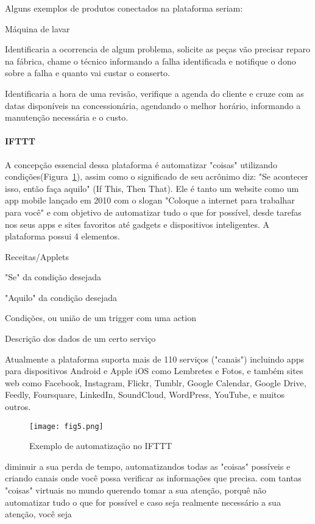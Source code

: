 	Alguns exemplos de produtos conectados na plataforma seriam: 
	\begin{labeling}{M\'aquina de lavar}
		\item[M\'aquina de lavar] Identificaria a ocorrencia de algum problema, solicite as pe\c{c}as v\~ao precisar reparo na f\'abrica, chame o t\'ecnico informando a falha identificada e notifique o dono sobre a falha e quanto vai custar o conserto. 
		\item[Carro] Identificaria a hora de uma revis\~ao, verifique a agenda do cliente e cruze com as datas dispon\'iveis na concession\'aria, agendando o melhor hor\'ario, informando a manuten\c{c}\~ao necess\'aria e o custo.
	\end{labeling}

\paragraph{IFTTT}
	A concep\c{c}\~ao essencial dessa plataforma \'e automatizar "coisas" utilizando condi\c{c}\~oes(Figura~\ref{fig:ifttt}), assim como o significado de seu acr\^onimo diz: "Se acontecer isso, ent\~ao fa\c{c}a aquilo" (If This, Then That). Ele \'e tanto um website como um app mobile lan\c{c}ado em 2010 com o slogan "Coloque a internet para trabalhar para voc\^e" e com objetivo de automatizar tudo o que for poss\'ivel, desde tarefas nos seus apps e sites favoritos at\'e gadgets e dispositivos inteligentes. A plataforma possui 4 elementos.
	
	\begin{labeling}{Receitas/Applets}
		\item[Gatilhos] "Se" da condi\c{c}\~ao desejada
		\item[A\c{c}\~oes] "Aquilo" da condi\c{c}\~ao desejada
		\item[Receitas/Applets] Condi\c{c}\~oes, ou uni\~ao de um trigger com uma action
		\item[Canais/Servi\c{c}os]  Descri\c{c}\~ao dos dados de um certo servi\c{c}o
	\end{labeling}
	
	Atualmente a plataforma suporta mais de 110 servi\c{c}os ("canais") incluindo apps para dispositivos Android e Apple iOS como Lembretes e Fotos, e tamb\'em sites web como Facebook, Instagram, Flickr, Tumblr, Google Calendar, Google Drive, Feedly, Foursquare, LinkedIn, SoundCloud, WordPress, YouTube, e muitos outros.
	
	\begin{figure}[ht]
		\centering
		\texttt{[image: fig5.png]}
		\caption{Exemplo de automatiza\c{c}\~ao no IFTTT}
		\label{fig:ifttt}
	\end{figure}
	
	diminuir a sua perda de tempo, automatizandos todas as "coisas" poss\'iveis e criando canais onde voc\^e possa verificar as informa\c{c}\~oes que precisa.  com tantas "coisas" virtuais no mundo querendo tomar a sua aten\c{c}\~ao, porqu\^e n\~ao automatizar tudo o que for poss\'ivel e caso seja realmente necess\'ario a sua aten\c{c}\~ao, voc\^e seja 
	
